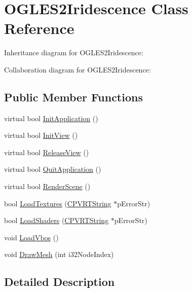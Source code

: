 \hypertarget{class_o_g_l_e_s2_iridescence}{\section{O\+G\+L\+E\+S2\+Iridescence Class Reference}
\label{class_o_g_l_e_s2_iridescence}
}


Inheritance diagram for O\+G\+L\+E\+S2\+Iridescence\+:


Collaboration diagram for O\+G\+L\+E\+S2\+Iridescence\+:
\subsection*{Public Member Functions}
\begin{DoxyCompactItemize}
\item 
virtual bool \hyperlink{class_o_g_l_e_s2_iridescence_a1430c5ebe5672d7e7e2aa465e284b9ac}{Init\+Application} ()
\item 
virtual bool \hyperlink{class_o_g_l_e_s2_iridescence_a0344e346330898434ae5fcfe5132b6c3}{Init\+View} ()
\item 
virtual bool \hyperlink{class_o_g_l_e_s2_iridescence_a58fe302bfc14c924d70eeda7353028ab}{Release\+View} ()
\item 
virtual bool \hyperlink{class_o_g_l_e_s2_iridescence_a8c2f2b2ec5f6cc3f0639e8941547c214}{Quit\+Application} ()
\item 
virtual bool \hyperlink{class_o_g_l_e_s2_iridescence_ac4a1b02eb1bea8c639682ab596f5480c}{Render\+Scene} ()
\item 
bool \hyperlink{class_o_g_l_e_s2_iridescence_a6d2c4e045ce13a0ac52d470d2551bf26}{Load\+Textures} (\hyperlink{class_c_p_v_r_t_string}{C\+P\+V\+R\+T\+String} $\ast$p\+Error\+Str)
\item 
bool \hyperlink{class_o_g_l_e_s2_iridescence_ae719fb24da26635f60afa5fe930f6202}{Load\+Shaders} (\hyperlink{class_c_p_v_r_t_string}{C\+P\+V\+R\+T\+String} $\ast$p\+Error\+Str)
\item 
void \hyperlink{class_o_g_l_e_s2_iridescence_ac56573ec5c7a0e08e1a1cf3593126639}{Load\+Vbos} ()
\item 
void \hyperlink{class_o_g_l_e_s2_iridescence_a14281f0568046bbd37a0f22f60809b97}{Draw\+Mesh} (int i32\+Node\+Index)
\end{DoxyCompactItemize}


\subsection{Detailed Description}


